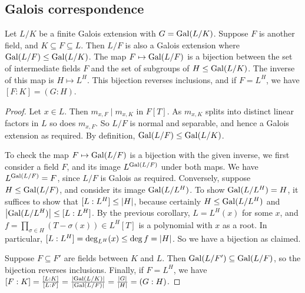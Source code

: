 \subsection{Galois correspondence}
\begin{theorem}
	Let \( L / K \) be a finite Galois extension with \( G = \operatorname{Gal}(L / K) \).
	Suppose \( F \) is another field, and \( K \subseteq F \subseteq L \).
	Then \( L / F \) is also a Galois extension where \( \operatorname{Gal}(L / F) \leq \operatorname{Gal}(L / K) \).
	The map \( F \mapsto \operatorname{Gal}(L / F) \) is a bijection between the set of intermediate fields \( F \) and the set of subgroups of \( H \leq \operatorname{Gal}(L/K) \).
	The inverse of this map is \( H \mapsto L^H \).
	This bijection reverses inclusions, and if \( F = L^H \), we have \( [F : K] = (G : H) \).
\end{theorem}
\begin{proof}
	Let \( x \in L \).
	Then \( m_{x,F} \mid m_{x,K} \) in \( F[T] \).
	As \( m_{x,K} \) splits into distinct linear factors in \( L \) so does \( m_{x,F} \).
	So \( L / F \) is normal and separable, and hence a Galois extension as required.
	By definition, \( \operatorname{Gal}(L / F) \leq \operatorname{Gal}(L / K) \).

	To check the map \( F \mapsto \operatorname{Gal}(L / F) \) is a bijection with the given inverse, we first consider a field \( F \), and its image \( L^{\operatorname{Gal}(L / F)} \) under both maps.
	We have \( L^{\operatorname{Gal}(L / F)} = F \), since \( L / F \) is Galois as required.
	Conversely, suppose \( H \leq \operatorname{Gal}(L / F) \), and consider its image \( \operatorname{Gal}(L / L^H) \).
	To show \( \operatorname{Gal}(L / L^H) = H \), it suffices to show that \( [L : L^H] \leq \abs{H} \), because certainly \( H \leq \operatorname{Gal}(L / L^H) \) and \( \abs{\operatorname{Gal}(L / L^H)} \leq [L : L^H] \).
	By the previous corollary, \( L = L^H(x) \) for some \( x \), and \( f = \prod_{\sigma \in H} (T - \sigma(x)) \in L^H[T] \) is a polynomial with \( x \) as a root.
	In particular, \( [L : L^H] = \deg_{L^H}(x) \leq \deg f = \abs{H} \).
	So we have a bijection as claimed.

	Suppose \( F \subseteq F' \) are fields between \( K \) and \( L \).
	Then \( \operatorname{Gal}(L/F') \subseteq \operatorname{Gal}(L/F) \), so the bijection reverses inclusions.
	Finally, if \( F = L^H \), we have \( [F : K] = \frac{[L : K]}{[L : F]} = \frac{\abs{\operatorname{Gal}(L / K)}}{\abs{\operatorname{Gal}(L / F)}} = \frac{\abs{G}}{\abs{H}} = (G : H) \).
\end{proof}
